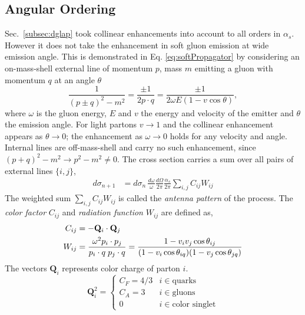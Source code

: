 \subsection{Angular Ordering}
Sec.~\ref{subsec:dglap} took collinear enhancements into account to all orders in
\(\alpha_s\). However it does not take the enhancement in soft gluon emission at wide emission angle. 
This is demonstrated in Eq. \ref{eq:softPropagator} by considering an on-mass-shell external line of
momentum \(p\), mass \(m\) emitting a gluon with momentum \(q\)  at an angle \(\theta\)
\begin{equation}
	\frac{1}{(p\pm q)^2 - m^2} = \frac{\pm1}{2p\cdot q}
	= \frac{\pm1}{2\omega E(1-v\cos\theta)},
	\label{eq:softPropagator}
\end{equation}
where \(\omega\) is the gluon energy, \(E\) and \(v\) the energy and velocity of the
emitter and \(\theta\) the emission angle. For light partons \(v\to1\) and the
collinear enhancement appears as \(\theta\to0\); the enhancement as \(\omega\to0\)
holds for any velocity and angle. Internal lines  are off-mass-shell and carry no such enhancement, since
\((p+q)^2-m^2\to p^2-m^2\neq0\). The cross section carries a sum over all pairs of external lines \(\{i,j\}\),
\begin{align}
	\label{eq:antennaSplitXSec}
	d\sigma_{n+1}& = d\sigma_n\,\frac{d\omega}{\omega}\frac{d\Omega}{2\pi}
	\frac{\alpha_s}{2\pi}\sum_{i,j}C_{ij}W_{ij}
\end{align}
The weighted sum \(\sum_{i,j}C_{ij}W_{ij}\)  is called the \emph{antenna pattern} of the process. The \emph{color factor} \(C_{ij}\) and \emph{radiation function} \(W_{ij}\)  are defined as,
\begin{align}
	C_{ij} &= -\mathbf{Q}_i\cdot\mathbf{Q}_j  \notag \\
	W_{ij} &= \frac{\omega^2 p_i\cdot p_j}{p_i\cdot q\;p_j\cdot q}
	= \frac{1-v_iv_j\cos\theta_{ij}}
	{(1-v_i\cos\theta_{iq})(1-v_j\cos\theta_{jq})}
\end{align}
  The vectors \(\mathbf{Q}_{i}\) represents color charge of parton \(i\). 
  \begin{equation}
  	\mathbf{Q}_i^2 = 
  	\begin{cases}
  		C_F = 4/3 & i \in \text{quarks} \\[-15pt]
  		C_A = 3 & i \in \text{gluons}\\[-15pt]
  		0 & i \in \text{color singlet}
  	\end{cases}
  \end{equation}
  
